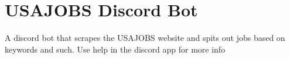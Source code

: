 \chapter{USAJOBS Discord Bot}
\hypertarget{md__r_e_a_d_m_e}{}\label{md__r_e_a_d_m_e}
\label{md__r_e_a_d_m_e_autotoc_md0}%
%


A discord bot that scrapes the USAJOBS website and spits out jobs based on keywords and such. Use help in the discord app for more info 